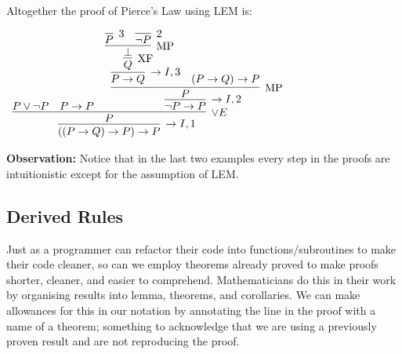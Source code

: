 \documentclass{book}
\begin{document}
\begin{eg} 
        Altogether the proof of Pierce's Law using LEM is: 

        \begin{center}
            $\begin{array}{c}
                \infer[\to I,1]{((P \to Q) \to P) \to P}
                    {\infer[\lor E]{P}
                        {P \lor \lnot P
                        &
                        P \to P
                        &
                        \infer[\to I,2]{\lnot P \to P}
                            {\infer[\MP]{P}
                                {\infer[\to I,3]{P \to Q}
                                    {\infer[\XF]{Q}
                                        {\infer[\MP]{\bot}
                                            {\infer[3]{P}{}
                                            &
                                            \infer[2]{\lnot P}{}}}}
                                &
                                (P \to Q) \to P}}}}               
            \end{array}$
        \end{center}
    \end{eg}

    {\bf Observation:} Notice that in the last two examples every step in the proofs are intuitionistic except for the assumption of LEM. 

    \newpage
    \subsection*{Derived Rules}

    Just as a programmer can refactor their code into functions/subroutines to make their code cleaner, so can we employ theorems already proved to make proofs shorter, cleaner, and easier to comprehend. Mathematicians do this in their work by organising results into lemma, theorems, and corollaries. We can make allowances for this in our notation by annotating the line in the proof with a name of a theorem; something to acknowledge that we are using a previously proven result and are not reproducing the proof. 
\end{document}
